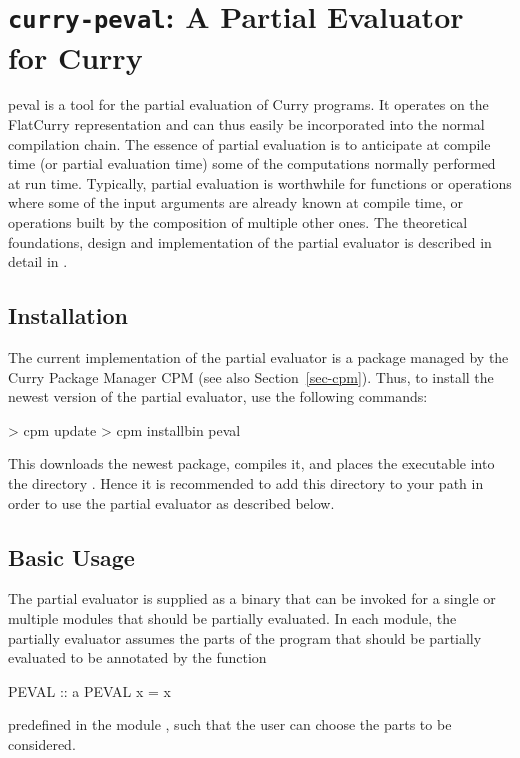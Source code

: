 \section{\texttt{curry-peval}: A Partial Evaluator for Curry}
\label{sec-peval}

peval
is a tool for the partial evaluation of Curry programs.
It operates on the FlatCurry representation and can thus
easily be incorporated into the normal compilation chain.
The essence of partial evaluation is to anticipate at compile time
(or partial evaluation time) some of the computations
normally performed at run time.
Typically, partial evaluation is worthwhile for functions or
operations where some of the input arguments are already known at compile time,
or operations built by the composition of multiple other ones.
The theoretical foundations, design and implementation of
the partial evaluator is described in detail in \cite{Peemoeller2016}.

\subsection{Installation}

The current implementation of the partial evaluator is a package
managed by the Curry Package Manager CPM
(see also Section~\ref{sec-cpm}).
Thus, to install the newest version of the partial evaluator,
use the following commands:
%
\begin{curry}
> cpm update
> cpm installbin peval
\end{curry}
%
This downloads the newest package, compiles it, and places
the executable  into the directory .
Hence it is recommended to add this directory to your path
in order to use the partial evaluator as described below.

\subsection{Basic Usage}

The partial evaluator is supplied as a binary that can be invoked
for a single or multiple modules that should be partially evaluated.
In each module, the partially evaluator assumes the parts of the program
that should be partially evaluated to be annotated by the function
\begin{curry}
PEVAL :: a
PEVAL x = x
\end{curry}
predefined in the module ,
such that the user can choose the parts to be considered.

